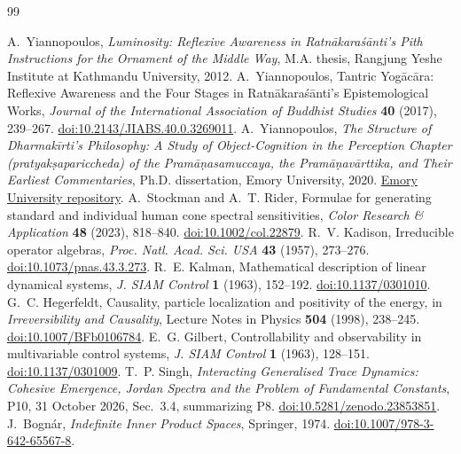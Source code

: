 \documentclass[11pt]{article}
\theoremstyle{definition}
\begin{document}
\begingroup\small
\begin{thebibliography}{99}
\raggedright
{} A.~Yiannopoulos, \emph{Luminosity: Reflexive Awareness in Ratn\=akara\'s\=anti's Pith Instructions for the Ornament of the Middle Way}, M.A. thesis, Rangjung Yeshe Institute at Kathmandu University, 2012.
 A.~Yiannopoulos, Tantric Yog\=ac\=ara: Reflexive Awareness and the Four Stages in Ratn\=akara\'s\=anti's Epistemological Works, \emph{Journal of the International Association of Buddhist Studies} \textbf{40} (2017), 239--267. \href{https://doi.org/10.2143/JIABS.40.0.3269011}{doi:10.2143/JIABS.40.0.3269011}.
 A.~Yiannopoulos, \emph{The Structure of Dharmak\=irti's Philosophy: A Study of Object-Cognition in the Perception Chapter (pratyak\d{s}apariccheda) of the Pram\=a\d{n}asamuccaya, the Pram\=a\d{n}av\=arttika, and Their Earliest Commentaries}, Ph.D. dissertation, Emory University, 2020. \href{https://etd.library.emory.edu/downloads/p2676w57z}{Emory University repository}.
 A.~Stockman and A.~T. Rider, Formulae for generating standard and individual human cone spectral sensitivities, \emph{Color Research \& Application} \textbf{48} (2023), 818--840. \href{https://doi.org/10.1002/col.22879}{doi:10.1002/col.22879}.
 R.~V. Kadison, Irreducible operator algebras, \emph{Proc. Natl. Acad. Sci. USA} \textbf{43} (1957), 273--276. \href{https://doi.org/10.1073/pnas.43.3.273}{doi:10.1073/pnas.43.3.273}.
 R.~E. Kalman, Mathematical description of linear dynamical systems, \emph{J. SIAM Control} \textbf{1} (1963), 152--192. \href{https://doi.org/10.1137/0301010}{doi:10.1137/0301010}.
 G.~C. Hegerfeldt, Causality, particle localization and positivity of the energy, in \emph{Irreversibility and Causality}, Lecture Notes in Physics \textbf{504} (1998), 238--245. \href{https://doi.org/10.1007/BFb0106784}{doi:10.1007/BFb0106784}.
 E.~G. Gilbert, Controllability and observability in multivariable control systems, \emph{J. SIAM Control} \textbf{1} (1963), 128--151. \href{https://doi.org/10.1137/0301009}{doi:10.1137/0301009}.
 T.~P. Singh, \emph{Interacting Generalised Trace Dynamics: Cohesive Emergence, Jordan Spectra and the Problem of Fundamental Constants}, P10, 31 October 2026, Sec.~3.4, summarizing P8. \href{https://doi.org/10.5281/zenodo.23853851}{doi:10.5281/zenodo.23853851}.
 J.~Bogn\'ar, \emph{Indefinite Inner Product Spaces}, Springer, 1974. \href{https://doi.org/10.1007/978-3-642-65567-8}{doi:10.1007/978-3-642-65567-8}.

\end{thebibliography}
\end{document}
